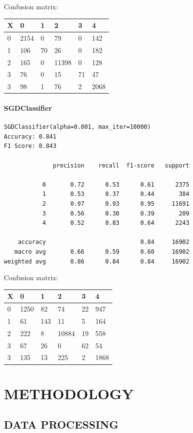 \documentclass[
]{article}
\begin{document}
Confusion matrix:

\begin{longtable}[]{@{}llllll@{}}
\toprule
X & 0 & 1 & 2 & 3 & 4\tabularnewline
\midrule
\endhead
0 & 2154 & 0 & 79 & 0 & 142\tabularnewline
1 & 106 & 70 & 26 & 0 & 182\tabularnewline
2 & 165 & 0 & 11398 & 0 & 128\tabularnewline
3 & 76 & 0 & 15 & 71 & 47\tabularnewline
3 & 98 & 1 & 76 & 2 & 2068\tabularnewline
\bottomrule
\end{longtable}

\hypertarget{sgdclassifier}{%
\paragraph{SGDClassifier}\label{sgdclassifier}}

\begin{verbatim}
SGDClassifier(alpha=0.001, max_iter=10000)
Accuracy: 0.841
F1 Score: 0.843

              precision    recall  f1-score   support

           0       0.72      0.53      0.61      2375
           1       0.53      0.37      0.44       384
           2       0.97      0.93      0.95     11691
           3       0.56      0.30      0.39       209
           4       0.52      0.83      0.64      2243

    accuracy                           0.84     16902
   macro avg       0.66      0.59      0.60     16902
weighted avg       0.86      0.84      0.84     16902
\end{verbatim}

Confusion matrix:

\begin{longtable}[]{@{}llllll@{}}
\toprule
X & 0 & 1 & 2 & 3 & 4\tabularnewline
\midrule
\endhead
0 & 1250 & 82 & 74 & 22 & 947\tabularnewline
1 & 61 & 143 & 11 & 5 & 164\tabularnewline
2 & 222 & 8 & 10884 & 19 & 558\tabularnewline
3 & 67 & 26 & 0 & 62 & 54\tabularnewline
3 & 135 & 13 & 225 & 2 & 1868\tabularnewline
\bottomrule
\end{longtable}

\hypertarget{methodology}{%
\section{METHODOLOGY}\label{methodology}}

\hypertarget{data-processing}{%
\subsection{DATA PROCESSING}\label{data-processing}}
\end{document}
